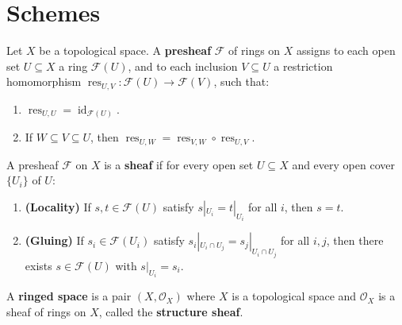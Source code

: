 


\section{Schemes}

\begin{definition}
    \label{def:presheaf}
    \notready
    Let $X$ be a topological space. A \textbf{presheaf} $\mathcal{F}$ of rings on $X$ assigns to each open set $U \subseteq X$ a ring $\mathcal{F}(U)$, and to each inclusion $V \subseteq U$ a restriction homomorphism $\operatorname{res}_{U,V} \colon \mathcal{F}(U) \to \mathcal{F}(V)$, such that:
    \begin{enumerate}
        \item $\operatorname{res}_{U,U} = \operatorname{id}_{\mathcal{F}(U)}$.
        \item If $W \subseteq V \subseteq U$, then $\operatorname{res}_{U,W} = \operatorname{res}_{V,W} \circ \operatorname{res}_{U,V}$.
    \end{enumerate}
\end{definition}

\begin{definition}[Sheaf]
    \label{def:sheaf}
    \notready
    A presheaf $\mathcal{F}$ on $X$ is a \textbf{sheaf} if for every open set $U \subseteq X$ and every open cover $\{U_i\}$ of $U$:
    \begin{enumerate}
        \item \textbf{(Locality)} If $s, t \in \mathcal{F}(U)$ satisfy $s|_{U_i} = t|_{U_i}$ for all $i$, then $s = t$.
        \item \textbf{(Gluing)} If $s_i \in \mathcal{F}(U_i)$ satisfy $s_i|_{U_i \cap U_j} = s_j|_{U_i \cap U_j}$ for all $i, j$, then there exists $s \in \mathcal{F}(U)$ with $s|_{U_i} = s_i$.
    \end{enumerate}
\end{definition}

\begin{definition}
    \label{def:ringed-space}
    \notready
    A \textbf{ringed space} is a pair $(X, \mathcal{O}_X)$ where $X$ is a topological space and $\mathcal{O}_X$ is a sheaf of rings on $X$, called the \textbf{structure sheaf}.
\end{definition}


